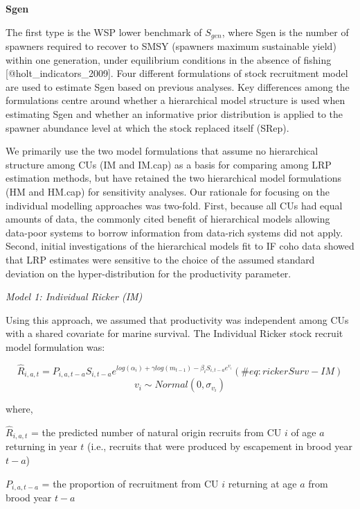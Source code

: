 \documentclass[
]{article}
\begin{document}
\textbf{Sgen}

The first type is the WSP lower benchmark of \(S_{gen}\), where Sgen is
the number of spawners required to recover to SMSY (spawners maximum
sustainable yield) within one generation, under equilibrium conditions
in the absence of fishing {[}@holt\_indicators\_2009{]}. Four different
formulations of stock recruitment model are used to estimate Sgen based
on previous analyses. Key differences among the formulations centre
around whether a hierarchical model structure is used when estimating
Sgen and whether an informative prior distribution is applied to the
spawner abundance level at which the stock replaced itself (SRep).

We primarily use the two model formulations that assume no hierarchical
structure among CUs (IM and IM.cap) as a basis for comparing among LRP
estimation methods, but have retained the two hierarchical model
formulations (HM and HM.cap) for sensitivity analyses. Our rationale for
focusing on the individual modelling approaches was two-fold. First,
because all CUs had equal amounts of data, the commonly cited benefit of
hierarchical models allowing data-poor systems to borrow information
from data-rich systems did not apply. Second, initial investigations of
the hierarchical models fit to IF coho data showed that LRP estimates
were sensitive to the choice of the assumed standard deviation on the
hyper-distribution for the productivity parameter.

\emph{Model 1: Individual Ricker (IM)}

Using this approach, we assumed that productivity was independent among
CUs with a shared covariate for marine survival. The Individual Ricker
stock recruit model formulation was:

\begin{equation}
  \hat{R}_{i,a,t} = P_{i,a,t-a}S_{i,t-a}e^{log(\alpha_i) + \gamma log(m_{t-1})-\beta_i S_{i,t-a}e^{v_i}}
   (\#eq:rickerSurv-IM)
\end{equation} \begin{equation}
  v_i \sim Normal(0,\sigma_{v_i})
\end{equation}

where,

\(\hat{R}_{i,a,t}\) = the predicted number of natural origin recruits
from CU \(i\) of age \(a\) returning in year \(t\) (i.e., recruits that
were produced by escapement in brood year \(t-a\))

\(P_{i,a,t-a}\) = the proportion of recruitment from CU \(i\) returning
at age \(a\) from brood year \(t-a\)
\end{document}
